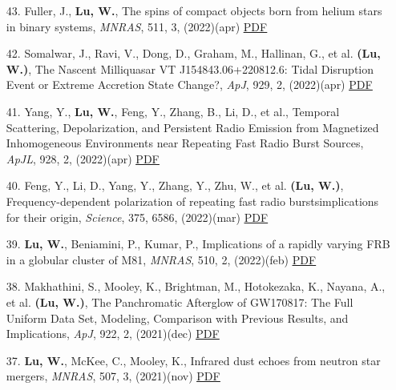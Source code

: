 \begin{itemize}[leftmargin=0.65cm]
\vspace{-0.1cm}
\item[43.]{Fuller, J., {\bf Lu, W.}, {The spins of compact objects born from helium stars in binary systems}, {\it MNRAS}, 511, 3, (2022)(apr) \href{https://ui.adsabs.harvard.edu/abs/2022MNRAS.511.3951F}{\underline{PDF}}}

\vspace{-0.1cm}
\item[42.]{Somalwar, J., Ravi, V., Dong, D., Graham, M., Hallinan, G., et al. {\bf (Lu, W.)}, {The Nascent Milliquasar VT J154843.06+220812.6: Tidal Disruption Event or Extreme Accretion State Change?}, {\it ApJ}, 929, 2, (2022)(apr) \href{https://ui.adsabs.harvard.edu/abs/2022ApJ...929..184S}{\underline{PDF}}}

\vspace{-0.1cm}
\item[41.]{Yang, Y., {\bf Lu, W.}, Feng, Y., Zhang, B., Li, D., et al., {Temporal Scattering, Depolarization, and Persistent Radio Emission from Magnetized Inhomogeneous Environments near Repeating Fast Radio Burst Sources}, {\it ApJL}, 928, 2, (2022)(apr) \href{https://ui.adsabs.harvard.edu/abs/2022ApJ...928L..16Y}{\underline{PDF}}}

\vspace{-0.1cm}
\item[40.]{Feng, Y., Li, D., Yang, Y., Zhang, Y., Zhu, W., et al. {\bf (Lu, W.)}, {Frequency-dependent polarization of repeating fast radio bursts{\textemdash}implications for their origin}, {\it Science}, 375, 6586, (2022)(mar) \href{https://ui.adsabs.harvard.edu/abs/2022Sci...375.1266F}{\underline{PDF}}}

\vspace{-0.1cm}
\item[39.]{{\bf Lu, W.}, Beniamini, P., Kumar, P., {Implications of a rapidly varying FRB in a globular cluster of M81}, {\it MNRAS}, 510, 2, (2022)(feb) \href{https://ui.adsabs.harvard.edu/abs/2022MNRAS.510.1867L}{\underline{PDF}}}

\vspace{-0.1cm}
\item[38.]{Makhathini, S., Mooley, K., Brightman, M., Hotokezaka, K., Nayana, A., et al. {\bf (Lu, W.)}, {The Panchromatic Afterglow of GW170817: The Full Uniform Data Set, Modeling, Comparison with Previous Results, and Implications}, {\it ApJ}, 922, 2, (2021)(dec) \href{https://ui.adsabs.harvard.edu/abs/2021ApJ...922..154M}{\underline{PDF}}}

\vspace{-0.1cm}
\item[37.]{{\bf Lu, W.}, McKee, C., Mooley, K., {Infrared dust echoes from neutron star mergers}, {\it MNRAS}, 507, 3, (2021)(nov) \href{https://ui.adsabs.harvard.edu/abs/2021MNRAS.507.3672L}{\underline{PDF}}}


\end{itemize}
